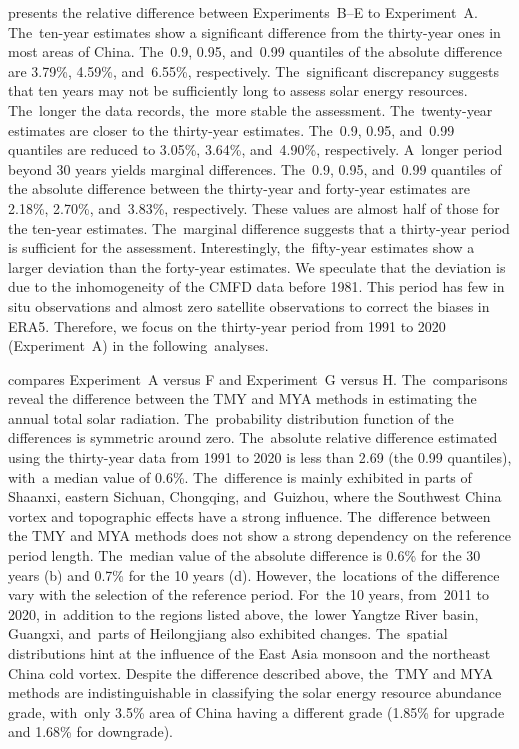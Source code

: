 \documentclass[atmosphere,article,accept,pdftex,moreauthors]{Definitions/mdpi}
\begin{document}
 presents the relative difference between Experiments~B--E to Experiment~A. The~ten-year estimates show a significant difference from the thirty-year ones in most areas of China. The~0.9, 0.95, and~0.99 quantiles of the absolute difference are 3.79\%, 4.59\%, and~6.55\%, respectively. The~significant discrepancy suggests that ten years may not be sufficiently long to assess solar energy resources. The~longer the data records, the~more stable the assessment. The~twenty-year estimates are closer to the thirty-year estimates. The~0.9, 0.95, and~0.99 quantiles are reduced to 3.05\%, 3.64\%, and~4.90\%, respectively. A~longer period beyond 30 years yields marginal differences. The~0.9, 0.95, and~0.99 quantiles of the absolute difference between the thirty-year and forty-year estimates are 2.18\%, 2.70\%, and~3.83\%, respectively. These values are almost half of those for the ten-year estimates. The~marginal difference suggests that a thirty-year period is sufficient for the assessment. Interestingly, the~fifty-year estimates show a larger deviation than the forty-year estimates. We speculate that the deviation is due to the inhomogeneity of the CMFD data before 1981. This period has few in situ observations and almost zero satellite observations to correct the biases in ERA5\@. Therefore, we focus on the thirty-year period from 1991 to 2020 (Experiment~A) in the following~analyses.

 compares Experiment~A versus F and Experiment~G versus H. The~comparisons reveal the difference between the TMY and MYA methods in estimating the annual total solar radiation. The~probability distribution function of the differences is symmetric around zero. The~absolute relative difference estimated using the thirty-year data from 1991 to 2020 is less than 2.69 (the 0.99 quantiles), with~a median value of 0.6\%. The~difference is mainly exhibited in parts of Shaanxi, eastern Sichuan, Chongqing, and~Guizhou, where the Southwest China vortex and topographic effects have a strong influence. The~difference between the TMY and MYA methods does not show a strong dependency on the reference period length. The~median value of the absolute difference is 0.6\% for the 30 years (\mbox{b}) and 0.7\% for the 10 years (d). However, the~locations of the difference vary with the selection of the reference period. For~the 10 years, from~2011 to 2020, in~addition to the regions listed above, the~lower Yangtze River basin, Guangxi, and~parts of Heilongjiang also exhibited changes. The~spatial distributions hint at the influence of the East Asia monsoon and the northeast China cold vortex. Despite the difference described above, the~TMY and MYA methods are indistinguishable in classifying the solar energy resource abundance grade, with~only 3.5\% area of China having a different grade (1.85\% for upgrade and 1.68\% for downgrade).
\end{document}
